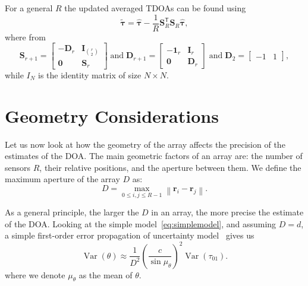 \noindent
For a general \(R\) the updated averaged TDOAs can be found using
\begin{equation}
\tilde{\boldsymbol{\tau}}=\boldsymbol{\hat{\tau}}-\frac{1}{R}\mathbf{S}_R^{\mathsf{T}}\mathbf{S}_R\boldsymbol{\hat{\tau}},
\end{equation}
where from~\cite{Least-squares-range}
\begin{equation}
\mathbf{S}_{r+1}
=\left[\begin{array}{cc}
-\mathbf{D}_r & \mathbf{I}_{\binom{r}{2}} \\
\mathbf{0} & \mathbf{S}_r
\end{array}\right]
\; \text{and} \;
\mathbf{D}_{r+1}=\left[\begin{array}{cc}
-\mathbf{1}_r & \mathbf{I}_r \\
\mathbf{0} & \mathbf{D}_r
\end{array}\right]
\; \text{and} \;
\mathbf{D}_2=\left[\begin{array}{ll}
-1 & 1
\end{array}\right],
\end{equation}
while \(I_{N}\) is the identity matrix of size \(N\times N\).


\section{Geometry Considerations}

Let us now look at how the geometry of the array affects the precision of the estimates of the DOA. The main geometric factors of an array are: the number of sensors \(R\), their relative positions, and the aperture between them. We define the maximum aperture of the array \(D\) as:
\begin{equation}
D = \underset{0\leq i,j\leq R-1}{\max} \left\|\mathbf{r}_i-\mathbf{r}_j\right\|.
\end{equation}

\noindent
As a general principle, the larger the \(D\) in an array, the more precise the estimate of the DOA. Looking at the simple model~\eqref{eq:simplemodel}, and assuming \(D=d\), a simple first-order error propagation of uncertainty model~\cite{wiki:Propagation_of_uncertainty} gives us
\begin{equation}
\operatorname{Var}(\theta) \approx
\frac{1}{D^2}
\left(\frac{c}{\sin \mu_\theta}\right)^2
\operatorname{Var}(\tau_{01}).
\label{eq:varD}
\end{equation}
where we denote \(\mu_\theta\) as the mean of \(\theta\). 

